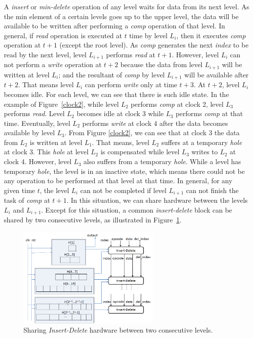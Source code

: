 \documentclass[10pt, conference, compsocconf]{IEEEtran}
\begin{document}
A {\it insert} or {\it min-delete} operation of any level waits for data from its next level.
As the min element of a certain levels goes up to the upper level, the data will be available to be written after performing a {\it comp} operation of that level.
In general, if {\it read} operation is executed at $t$ time by level $L_i$, then it executes {\it comp} operation at $t+1$ (except the root level).
As {\it comp} generates the next {\it index} to be read by the next level, level $L_{i+1}$ performs {\it read} at $t+1$.
However, level $L_i$ can not perform a {\it write} operation at $t+2$ because the data from level $L_{i+1}$ will be written at level $L_i$; and the resultant of {\it comp} by level $L_{i+1}$ will be available after $t+2$.
That means level $L_i$ can perform {\it write} only at time $t+3$.
At $t+2$, level $L_i$ becomes idle.
For each level, we can see that there is such idle state.
In the example of Figure~\ref{clock2}, while level $L_2$ performs {\it comp} at clock 2, level $L_3$ performs {\it read}.
Level $L_2$ becomes idle at clock 3 while $L_3$ performs {\it comp} at that time.
Eventually, level $L_2$ performs {\it write} at clock 4 after the data becomes available by level $L_3$.
From Figure \ref{clock2}, we can see that at clock 3 the data from $L_2$ is written at level $L_1$.
That means, level $L_2$ suffers at a temporary {\it hole} at clock 3.
This {\it hole} at level $L_2$ is compensated while level $L_3$ writes to $L_2$ at clock 4.
However, level $L_3$ also suffers from a temporary {\it hole}.
While a level has temporary {\it hole}, the level is in an inactive state, which means there could not be any operation to be performed at that level at that time.
In general, for any given time $t$, the level $L_i$ can not be completed if level $L_{i+1}$ can not finish the task of {\it comp} at $t+1$.
In this situation, we can share hardware between the levels $L_i$ and $L_{i+1}$.
Except for this situation, a common {\it insert-delete} block can be shared by two consecutive levels, as illustrated in Figure~\ref{d3}.

\begin{figure}[!ht]
  \centering
  \includegraphics[width=7cm]{Figures/d3.png}
      \caption{Sharing {\it Insert-Delete} hardware between two consecutive levels.}
    \label{d3}
\end{figure}
\end{document}
